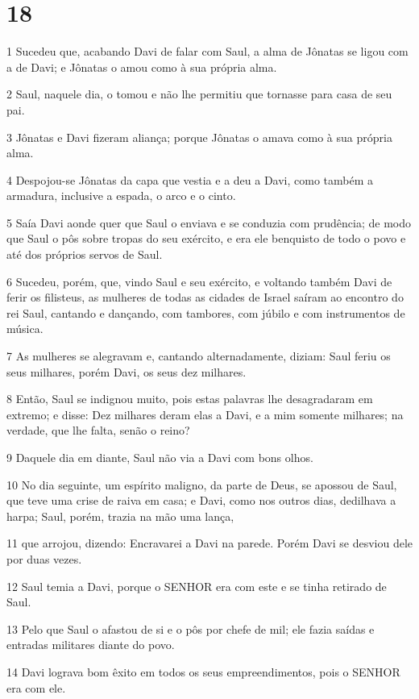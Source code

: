 \chapter{18}

\par 1 Sucedeu que, acabando Davi de falar com Saul, a alma de Jônatas se ligou com a de Davi; e Jônatas o amou como à sua própria alma.
\par 2 Saul, naquele dia, o tomou e não lhe permitiu que tornasse para casa de seu pai.
\par 3 Jônatas e Davi fizeram aliança; porque Jônatas o amava como à sua própria alma.
\par 4 Despojou-se Jônatas da capa que vestia e a deu a Davi, como também a armadura, inclusive a espada, o arco e o cinto.
\par 5 Saía Davi aonde quer que Saul o enviava e se conduzia com prudência; de modo que Saul o pôs sobre tropas do seu exército, e era ele benquisto de todo o povo e até dos próprios servos de Saul.
\par 6 Sucedeu, porém, que, vindo Saul e seu exército, e voltando também Davi de ferir os filisteus, as mulheres de todas as cidades de Israel saíram ao encontro do rei Saul, cantando e dançando, com tambores, com júbilo e com instrumentos de música.
\par 7 As mulheres se alegravam e, cantando alternadamente, diziam: Saul feriu os seus milhares, porém Davi, os seus dez milhares.
\par 8 Então, Saul se indignou muito, pois estas palavras lhe desagradaram em extremo; e disse: Dez milhares deram elas a Davi, e a mim somente milhares; na verdade, que lhe falta, senão o reino?
\par 9 Daquele dia em diante, Saul não via a Davi com bons olhos.
\par 10 No dia seguinte, um espírito maligno, da parte de Deus, se apossou de Saul, que teve uma crise de raiva em casa; e Davi, como nos outros dias, dedilhava a harpa; Saul, porém, trazia na mão uma lança,
\par 11 que arrojou, dizendo: Encravarei a Davi na parede. Porém Davi se desviou dele por duas vezes.
\par 12 Saul temia a Davi, porque o SENHOR era com este e se tinha retirado de Saul.
\par 13 Pelo que Saul o afastou de si e o pôs por chefe de mil; ele fazia saídas e entradas militares diante do povo.
\par 14 Davi lograva bom êxito em todos os seus empreendimentos, pois o SENHOR era com ele.

